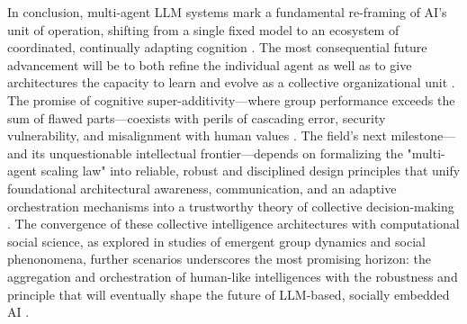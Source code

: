 \documentclass[11pt,a4paper]{article}
\begin{document}
In conclusion, multi-agent LLM systems mark a fundamental re-framing of AI's unit of operation, shifting from a single fixed model to an ecosystem of coordinated, continually adapting cognition \cite{arxiv:2411.14033v2}. The most consequential future advancement will be to both refine the individual agent as well as to give architectures the capacity to learn and evolve as a collective organizational unit \cite{arxiv:2510.23595v3,arxiv:2502.18439v2}. The promise of cognitive super-additivity---where group performance exceeds the sum of flawed parts---coexists with perils of cascading error, security vulnerability, and misalignment with human values \cite{arxiv:2602.01011v4,arxiv:2502.14321v3}. The field's next milestone---and its unquestionable intellectual frontier---depends on formalizing the "multi-agent scaling law" into reliable, robust and disciplined design principles that unify foundational architectural awareness, communication, and an adaptive orchestration mechanisms into a trustworthy theory of collective decision-making \cite{arxiv:2512.08296v3,arxiv:2501.06322v1}. The convergence of these collective intelligence architectures with computational social science, as explored in studies of emergent group dynamics and social phenonomena, further scenarios underscores the most promising horizon: the aggregation and orchestration of human-like intelligences with the robustness and principle that will eventually shape the future of LLM-based, socially embedded AI \cite{arxiv:2506.01839v3,arxiv:2601.10567v1}.
\end{document}
